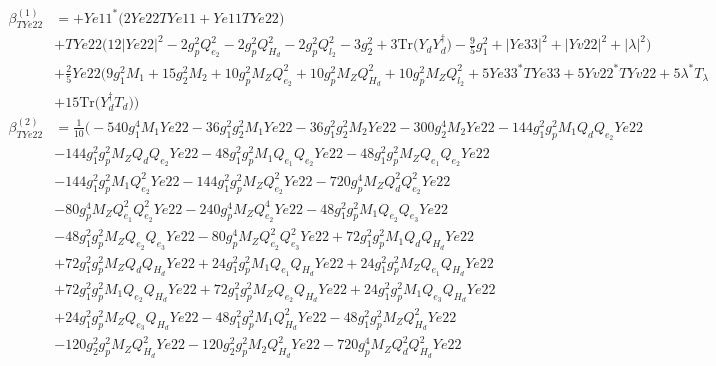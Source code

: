 \begin{align}
\beta_{TYe22}^{(1)} & =  
+Ye11^* \Big(2 Ye22 TYe11  + Ye11 TYe22 \Big)\nonumber \\ 
 &+TYe22 \Big(12 |Ye22|^2  -2 g_{p}^{2} Q_{e_{2}}^{2}  -2 g_{p}^{2} Q_{H_d}^{2}  -2 g_{p}^{2} Q_{l_2}^{2}  -3 g_{2}^{2}  + 3 \mbox{Tr}\Big({Y_d  Y_{d}^{\dagger}}\Big)  -\frac{9}{5} g_{1}^{2}  + |Ye33|^2 + |Yv22|^2 + |\lambda|^2\Big)\nonumber \\ 
 &+\frac{2}{5} Ye22 \Big(9 g_{1}^{2} M_1 +15 g_{2}^{2} M_2 +10 g_{p}^{2} M_Z Q_{e_{2}}^{2} +10 g_{p}^{2} M_Z Q_{H_d}^{2} +10 g_{p}^{2} M_Z Q_{l_2}^{2} +5 Ye33^* TYe33 +5 Yv22^* TYv22 +5 \lambda^* T_{\lambda} \nonumber \\ 
 &+15 \mbox{Tr}\Big({Y_{d}^{\dagger}  T_d}\Big) \Big)\\ 
\beta_{TYe22}^{(2)} & =  
\frac{1}{10} \Big(-540 g_{1}^{4} M_1 Ye22 -36 g_{1}^{2} g_{2}^{2} M_1 Ye22 -36 g_{1}^{2} g_{2}^{2} M_2 Ye22 -300 g_{2}^{4} M_2 Ye22 -144 g_{1}^{2} g_{p}^{2} M_1 Q_{d} Q_{e_{2}} Ye22 \nonumber \\ 
 &-144 g_{1}^{2} g_{p}^{2} M_Z Q_{d} Q_{e_{2}} Ye22 -48 g_{1}^{2} g_{p}^{2} M_1 Q_{e_{1}} Q_{e_{2}} Ye22 -48 g_{1}^{2} g_{p}^{2} M_Z Q_{e_{1}} Q_{e_{2}} Ye22 \nonumber \\ 
 &-144 g_{1}^{2} g_{p}^{2} M_1 Q_{e_{2}}^{2} Ye22 -144 g_{1}^{2} g_{p}^{2} M_Z Q_{e_{2}}^{2} Ye22 -720 g_{p}^{4} M_Z Q_{d}^{2} Q_{e_{2}}^{2} Ye22 \nonumber \\ 
 &-80 g_{p}^{4} M_Z Q_{e_{1}}^{2} Q_{e_{2}}^{2} Ye22 -240 g_{p}^{4} M_Z Q_{e_{2}}^{4} Ye22 -48 g_{1}^{2} g_{p}^{2} M_1 Q_{e_{2}} Q_{e_3} Ye22 \nonumber \\ 
 &-48 g_{1}^{2} g_{p}^{2} M_Z Q_{e_{2}} Q_{e_3} Ye22 -80 g_{p}^{4} M_Z Q_{e_{2}}^{2} Q_{e_3}^{2} Ye22 +72 g_{1}^{2} g_{p}^{2} M_1 Q_{d} Q_{H_d} Ye22 \nonumber \\ 
 &+72 g_{1}^{2} g_{p}^{2} M_Z Q_{d} Q_{H_d} Ye22 +24 g_{1}^{2} g_{p}^{2} M_1 Q_{e_{1}} Q_{H_d} Ye22 +24 g_{1}^{2} g_{p}^{2} M_Z Q_{e_{1}} Q_{H_d} Ye22 \nonumber \\ 
 &+72 g_{1}^{2} g_{p}^{2} M_1 Q_{e_{2}} Q_{H_d} Ye22 +72 g_{1}^{2} g_{p}^{2} M_Z Q_{e_{2}} Q_{H_d} Ye22 +24 g_{1}^{2} g_{p}^{2} M_1 Q_{e_3} Q_{H_d} Ye22 \nonumber \\ 
 &+24 g_{1}^{2} g_{p}^{2} M_Z Q_{e_3} Q_{H_d} Ye22 -48 g_{1}^{2} g_{p}^{2} M_1 Q_{H_d}^{2} Ye22 -48 g_{1}^{2} g_{p}^{2} M_Z Q_{H_d}^{2} Ye22 \nonumber \\ 
 &-120 g_{2}^{2} g_{p}^{2} M_Z Q_{H_d}^{2} Ye22 -120 g_{2}^{2} g_{p}^{2} M_2 Q_{H_d}^{2} Ye22 -720 g_{p}^{4} M_Z Q_{d}^{2} Q_{H_d}^{2} Ye22 \nonumber \\ 

\end{align}

